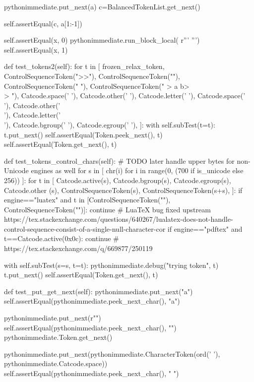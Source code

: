 \documentclass[a5paper]{article}
\begin{document}
\begin{pycode}
			pythonimmediate.put_next(a)
			c=BalancedTokenList.get_next()

			self.assertEqual(c, a[1:-1])


		self.assertEqual(x, 0)
		pythonimmediate.run_block_local(
		r'''
		''')
		self.assertEqual(x, 1)

	def test_tokens2(self):
		for t in [
				frozen_relax_token,
				ControlSequenceToken(">>"),
				ControlSequenceToken(""),
				ControlSequenceToken("  "),
				ControlSequenceToken(" > a b>\\> "),
				Catcode.space(' '),
				Catcode.other(' '),
				Catcode.letter(' '),
				Catcode.space('\\'),
				Catcode.other('\\'),
				Catcode.letter('\\'),
				Catcode.bgroup(' '),
				Catcode.egroup(' '),
				]:
			with self.subTest(t=t):
				t.put_next()
				self.assertEqual(Token.peek_next(), t)
				self.assertEqual(Token.get_next(), t)

	def test_tokens_control_chars(self):
		# TODO later handle upper bytes for non-Unicode engines as well
		for s in [
				chr(i)
				for i in range(0, (700 if is_unicode else 256))
				]:
			for t in [
				Catcode.active(s),
				Catcode.bgroup(s),
				Catcode.egroup(s),
				Catcode.other (s),
				ControlSequenceToken(s),
				ControlSequenceToken(s+s),
				]:
				if engine=="luatex" and t in [ControlSequenceToken(""), ControlSequenceToken("")]:
					continue  # LuaTeX bug fixed upstream https://tex.stackexchange.com/questions/640267/lualatex-does-not-handle-control-sequence-consist-of-a-single-null-character-cor
				if engine=="pdftex" and t==Catcode.active(0x0c):
					continue  # https://tex.stackexchange.com/q/669877/250119

				with self.subTest(s=s, t=t):
					pythonimmediate.debug("trying token", t)
					t.put_next()
					self.assertEqual(Token.get_next(), t)

	def test_put_get_next(self):
		pythonimmediate.put_next("a")
		self.assertEqual(pythonimmediate.peek_next_char(), "a")

		pythonimmediate.put_next(r"\a")
		self.assertEqual(pythonimmediate.peek_next_char(), "")
		pythonimmediate.Token.get_next()

		pythonimmediate.put_next(pythonimmediate.CharacterToken(ord(' '), pythonimmediate.Catcode.space))
		self.assertEqual(pythonimmediate.peek_next_char(), " ")


\end{pycode}
\end{document}
